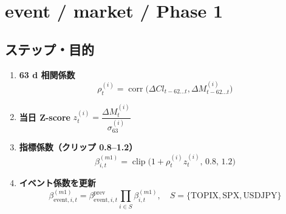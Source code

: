 
\section*{event / market / Phase 1}\nopagebreak[4]
\subsection*{ステップ・目的}
\begin{flushleft}
\begin{enumerate}
  \item \textbf{63 d 相関係数}
        \[
          \rho_t^{(i)}
            =\operatorname{corr}\!\bigl(
              \Delta Cl_{t-62 \ldots t},
              \Delta M_{t-62 \ldots t}^{(i)}
            \bigr)
        \]
  \item \textbf{当日 Z-score}
        \(
          z_t^{(i)}
            =\dfrac{\Delta M_t^{(i)}}{\sigma_{63}^{(i)}}
        \)
  \item \textbf{指標係数（クリップ 0.8--1.2）}
        \[
          \beta_{i,t}^{(m1)}
            =\operatorname{clip}\!\bigl(
               1+\rho_t^{(i)}z_t^{(i)},\,0.8,\,1.2
             \bigr)
        \]
  \item \textbf{イベント係数を更新}
        \[
          \beta_{\text{event},i,t}^{(m1)}
            =\beta_{\text{event},i,t}^{\text{prev}}
             \prod_{i \in S} \beta_{i,t}^{(m1)},
          \quad
          S=\{\text{TOPIX},\text{SPX},\text{USDJPY}\}
        \]
\end{enumerate}
\end{flushleft}


